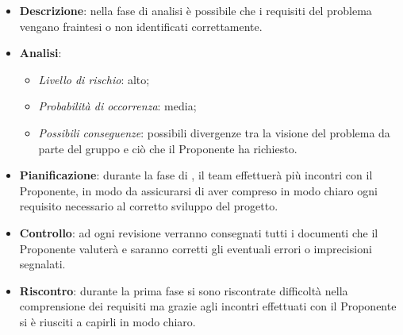 			\begin{itemize}
				\item \textbf{Descrizione}: nella fase di analisi è possibile che i requisiti del problema vengano fraintesi o non identificati correttamente. 
				\item \textbf{Analisi}:
				\begin{itemize}
					\item \textit{Livello di rischio}: alto;
					\item \textit{Probabilità di occorrenza}: media;
					\item \textit{Possibili conseguenze}: possibili divergenze tra la visione del problema da parte del gruppo e ciò che il Proponente ha richiesto.
				\end{itemize}
				\item \textbf{Pianificazione}: durante la fase di , il team effettuerà più incontri con il Proponente, in modo da assicurarsi di aver compreso in modo chiaro ogni requisito necessario al corretto sviluppo del progetto.
				\item \textbf{Controllo}: ad ogni revisione verranno consegnati tutti i documenti che il Proponente valuterà e saranno corretti gli eventuali errori o imprecisioni segnalati.
				\item \textbf{Riscontro}: durante la prima fase si sono riscontrate difficoltà nella comprensione dei requisiti ma grazie agli incontri effettuati con il Proponente si è riusciti a capirli in modo chiaro.
			\end{itemize}
